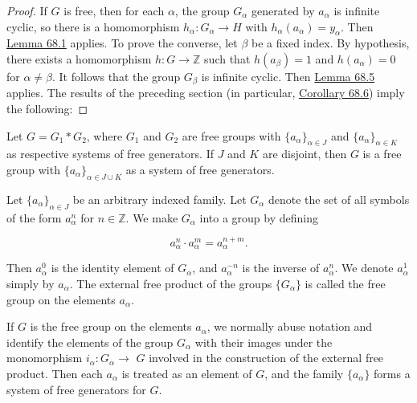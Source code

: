 \begin{proof}
If \(G\) is free, then for each \(\alpha\), the group \(G_{\alpha }\) generated by \(a_{\alpha }\) is infinite cyclic, so there is a homomorphism \(h_{\alpha } : G_{\alpha } \rightarrow H\) with \(h_{\alpha }( a_{\alpha }) = y_{\alpha }\). Then \hyperref[lem:68.1]{Lemma 68.1} applies. To prove the converse, let \(\beta\) be a fixed index. By hypothesis, there exists a homomorphism \(h : G \rightarrow \mathbb{Z}\) such that \(h( a_{\beta }) = 1\) and \(h( a_{\alpha }) = 0\) for \(\alpha \neq \beta\). It follows that the group \(G_{\beta }\) is infinite cyclic. Then \hyperref[lem:68.5]{Lemma 68.5} applies.
The results of the preceding section (in particular, \hyperref[cor:68.6]{Corollary 68.6}) imply the following:
\end{proof}
\begin{theorem}
\label{thm:\thetheorem}
Let \(G = G_{1} * G_{2}\), where \(G_{1}\) and \(G_{2}\) are free groups with \({\{ a_{\alpha }\} }_{\alpha \in J}\) and \({\{ a_{\alpha }\} }_{\alpha \in K}\) as respective systems of free generators. If \(J\) and \(K\) are disjoint, then \(G\) is a free group with \({\{ a_{\alpha }\} }_{\alpha \in J \cup K}\) as a system of free generators.
\end{theorem}

\begin{definition}
Let \({\{ a_{\alpha }\} }_{\alpha \in J}\) be an arbitrary indexed family. Let \(G_{\alpha }\) denote the set of all symbols of the form \(a_{\alpha }^{n}\) for \(n \in \mathbb{Z}\). We make \(G_{\alpha }\) into a group by defining

\[
a_{\alpha }^{n} \cdot {a}_{\alpha }^{m} = a_{\alpha }^{n + m}.
\]

Then \(a_{\alpha }^{0}\) is the identity element of \(G_{\alpha }\), and \(a_{\alpha }^{-n}\) is the inverse of \(a_{\alpha }^{n}\). We denote \(a_{\alpha }^{1}\) simply by \(a_{\alpha }\). The external free product of the groups \(\{ G_{\alpha }\}\) is called the free group on the elements \(a_{\alpha }\).
\end{definition}

If \(G\) is the free group on the elements \(a_{\alpha }\), we normally abuse notation and identify the elements of the group \(G_{\alpha }\) with their images under the monomorphism \(i_{\alpha } : G_{\alpha } \rightarrow\) \(G\) involved in the construction of the external free product. Then each \(a_{\alpha }\) is treated as an element of \(G\), and the family \(\{ a_{\alpha }\}\) forms a system of free generators for \(G\).

